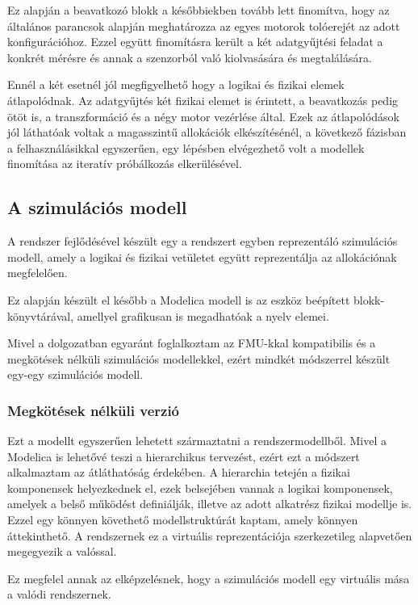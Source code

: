     Ez alapján a beavatkozó blokk a későbbiekben tovább lett finomítva, hogy az általános parancsok alapján meghatározza az egyes motorok tolóerejét az adott konfigurációhoz. 
    Ezzel együtt finomításra került a két adatgyűjtési feladat a konkrét mérésre és annak a szenzorból való kiolvasására és megtalálására.
    
    Ennél a két esetnél jól megfigyelhető hogy a logikai és fizikai elemek átlapolódnak. Az adatgyűjtés két fizikai elemet is érintett, a beavatkozás pedig ötöt is, a transzformáció és a négy motor vezérlése által.
    Ezek az átlapolódások jól láthatóak voltak a magasszintű allokációk elkészítésénél, a következő fázisban a felhasználásikkal egyszerűen, egy lépésben elvégezhető volt a modellek finomítása az iteratív próbálkozás elkerülésével.


    \subsection{A szimulációs modell}
    A rendszer fejlődésével készült egy a rendszert egyben reprezentáló szimulációs modell, amely a logikai és fizikai vetületet együtt reprezentálja az allokációnak megfelelően.
    
    Ez alapján készült el később a Modelica modell is az eszköz beépített blokk-könyvtárával, amellyel grafikusan is megadhatóak a nyelv elemei.
    
    Mivel a dolgozatban egyaránt foglalkoztam az FMU-kkal kompatibilis és a megkötések nélküli szimulációs modellekkel, ezért mindkét módszerrel készült egy-egy szimulációs modell.

        \subsubsection{Megkötések nélküli verzió}
        Ezt a modellt egyszerűen lehetett származtatni a rendszermodellből. Mivel a Modelica is lehetővé teszi a hierarchikus tervezést, ezért ezt a módszert alkalmaztam az átláthatóság érdekében.
        A hierarchia tetején a fizikai komponensek helyezkednek el, ezek belsejében vannak a logikai komponensek, amelyek a belső működést definiálják, illetve az adott alkatrész fizikai modellje is.
        Ezzel egy könnyen követhető modellstruktúrát kaptam, amely könnyen áttekinthető. A rendszernek ez a virtuális reprezentációja szerkezetileg alapvetően megegyezik a valóssal.
        
        Ez megfelel annak az elképzelésnek, hogy a szimulációs modell egy virtuális mása a valódi rendszernek.

